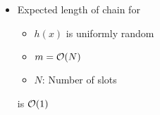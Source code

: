 \begin{itemize}
\begin{itemize}
\begin{itemize}
\begin{itemize}
\begin{itemize}
                                \end{itemize}
                            \item Expected length of chain for
                                \begin{itemize}
                                    \item $h(x)$ is uniformly random
                                    \item $m = \mathcal{O}(N)$
                                    \item $N$: Number of slots
                                \end{itemize}
                            is $\mathcal{O}(1)$
                        \end{itemize}
                \end{itemize}
        \end{itemize}
\end{itemize}
